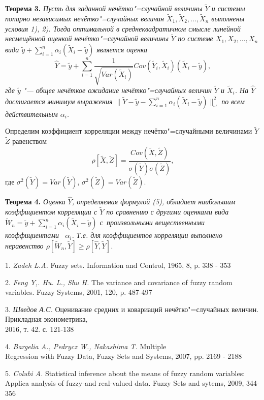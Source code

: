 \textbf{Теорема 3.} \textit{Пусть для заданной нечётко"=случайной
величины $\tilde{Y}$ и системы попарно независимых
нечётко"=случайных величин $\tilde{X}_1, \tilde{X}_2,..., \tilde{X}_n$ выполнены условия 1), 2). Тогда оптимальной в среднеквадратичном смысле линейной несмещённой оценкой нечётко"=случайной величины $\tilde{Y}$ по системе $X_1, X_2,..., X_n$ вида $\tilde{y}+\sum\limits_{i=1}^n\alpha_i(\tilde{X}_i - \tilde{y})$ является оценка }
\begin{equation}
\hat{Y} = \tilde{y} + \sum\limits_{i=1}^n\frac{1}{\sqrt{Var(\tilde{X}_i)}}Cov(\tilde{Y}_i, \tilde{X}_i)(\tilde{X}_i-\tilde{y}),
\end{equation}
\textit{где $\tilde{y}$ "--- общее нечёткое ожидание нечётко"=случайных величин $\tilde{Y}$ и $\tilde{X}_i$. На $\hat{Y}$ достигается минимум выражения $\|\tilde{Y} - \tilde{y} -\sum\limits_{i=1}^n\alpha_i(\tilde{X}_i-\tilde{y})\|_{\omega}^2$ по всем действительным $\alpha_i$.}

Определим коэффициент корреляции между нечётко"=случайными величинами $\tilde{Y}$ $\tilde{Z}$ равенством
$$
\rho[\tilde{X}, \tilde{Z}] = \frac{Cov(\tilde{X}, \tilde{Z})}{\sigma(\tilde{Y})\sigma(\tilde{Z})},
$$
где $\sigma^2(\tilde{Y}) = Var(\tilde{Y})$, $\sigma^2(\tilde{Z}) = Var(\tilde{Z})$.

\textbf{Теорема 4.} \textit{Оценка $\hat{Y}$, определяемая формулой (5),
обладает наибольшим коэффициентом корреляции с $\tilde{Y}$
по сра\-в\-не\-нию с другими оценками вида $\tilde{W}_n = \tilde{y} + \sum\limits_{i=1}^n\alpha_i(\tilde{X}_i - \tilde{y})$
с~произвольными вещественными коэффициентами ~$\alpha_i$.
\linebreak
Т.е. для коэффициентов корреляции выполнено неравенство
\linebreak
$\rho[\tilde{W}_n, \tilde{Y}]\geq \rho[\hat{Y},\tilde{Y}] $. }

\litlist

1. {\it Zadeh L.A.} Fuzzy sets. Information and Control, 1965, 8, p. 338 - 353

2. {\it Feng Y,. Hu. L., Shu H.} The variance and covariance of fuzzy random variables. Fuzzy Systems,
2001, 120, p. 487-497

3. {\it Шведов А.С.} Оценивание средних и ковариаций
нечётко"=случайных величин. Прикладная эконометрика,
\\2016, т. 42. с. 121-138

4. {\it Bargelia A., Pedrycz W., Nakashima T.} Multiple
\\Regression with Fuzzy Data, Fuzzy Sets and Systems, 2007, pp. 2169 - 2188

5. {\it Colubi A.} Statistical inference about the means of fuzzy random variables: Applica analysis of fuzzy-and real-valued data. Fuzzy Sets and sytems, 2009, 344-356
